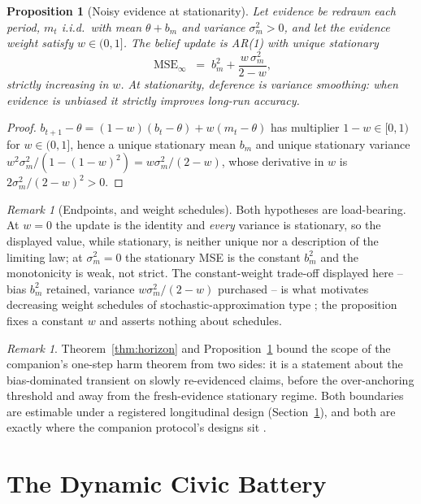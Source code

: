 \documentclass[11pt]{article}
\newtheorem{proposition}[theorem]{Proposition}
\theoremstyle{definition}
\theoremstyle{remark}
\newtheorem{remark}[theorem]{Remark}
\numberwithin{equation}{section}
\DeclareMathOperator{\MSE}{MSE}
\begin{document}
\begin{proposition}[Noisy evidence at stationarity]\label{prop:ar1}
Let evidence be redrawn each period, $m_t$ i.i.d.\ with mean $\theta + b_m$ and variance $\sigma_m^2 > 0$, and let the evidence weight satisfy $w \in (0,1]$. The belief update is AR(1) with unique stationary
\begin{equation}\label{eq:ar1}
\MSE_\infty \;=\; b_m^2 + \frac{w\,\sigma_m^2}{2-w},
\end{equation}
strictly increasing in $w$. At stationarity, deference is variance smoothing: when evidence is unbiased it strictly improves long-run accuracy.
\end{proposition}
\begin{proof}
$b_{t+1}-\theta = (1-w)(b_t-\theta) + w(m_t-\theta)$ has multiplier $1-w \in [0,1)$ for $w \in (0,1]$, hence a unique stationary mean $b_m$ and unique stationary variance $w^2\sigma_m^2/(1-(1-w)^2) = w\sigma_m^2/(2-w)$, whose derivative in $w$ is $2\sigma_m^2/(2-w)^2 > 0$.
\end{proof}

\begin{remark}[Endpoints, and weight schedules]\label{rem:ar1end}
Both hypotheses are load-bearing. At $w = 0$ the update is the identity and \emph{every} variance is stationary, so the displayed value, while stationary, is neither unique nor a description of the limiting law; at $\sigma_m^2 = 0$ the stationary MSE is the constant $b_m^2$ and the monotonicity is weak, not strict. The constant-weight trade-off displayed here -- bias $b_m^2$ retained, variance $w\sigma_m^2/(2-w)$ purchased -- is what motivates decreasing weight schedules of stochastic-approximation type \citep{robbins1951stochastic}; the proposition fixes a constant $w$ and asserts nothing about schedules.
\end{remark}

\begin{remark}\label{rem:reconcile}
Theorem~\ref{thm:horizon} and Proposition~\ref{prop:ar1} bound the scope of the companion's one-step harm theorem from two sides: it is a statement about the bias-dominated transient on slowly re-evidenced claims, before the over-anchoring threshold and away from the fresh-evidence stationary regime. Both boundaries are estimable under a registered longitudinal design (Section~\ref{sec:battery}), and both are exactly where the companion protocol's designs sit \citep{hofheinz2026audit}.
\end{remark}

\section{The Dynamic Civic Battery}\label{sec:battery}
\end{document}
